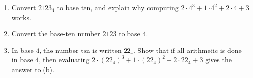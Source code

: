 \begin{enumerate}
\item[(a)] Convert $2123_4$ to base ten, and explain why computing $2\cdot4^3+1\cdot4^2+2\cdot4+3$ works.
\item[(b)] Convert the base-ten number $2123$ to base $4$.
\item[(c)] In base $4$, the number ten is written $22_4$. Show that if all arithmetic is done in base $4$, then evaluating $2\cdot(22_4)^3+1\cdot(22_4)^2+2\cdot22_4+3$ gives the answer to (b).
\end{enumerate}
